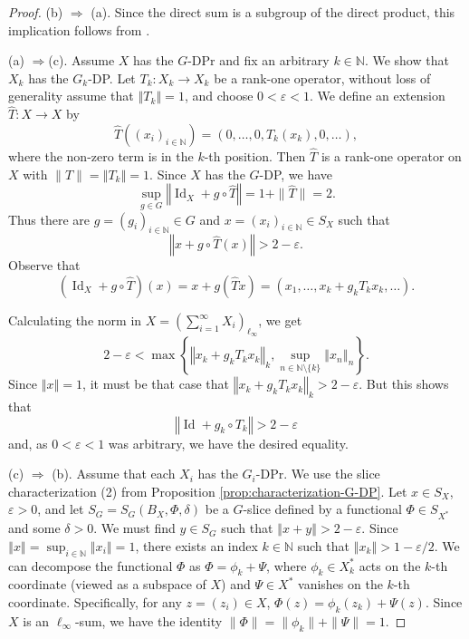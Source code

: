 \documentclass[a4paper,12pt]{amsart}
\theoremstyle{definition}
\theoremstyle{definition}
\theoremstyle{remark}
\numberwithin{equation}{section}
\newcommand{\N}{\mathbb{N}}
\DeclareMathOperator{\id}{Id}
\newcommand{\<}{\langle}
\renewcommand{\>}{\rangle}
\newcommand{\norm}[1]{\left\Vert#1\right\Vert}
\newcommand{\e}{\varepsilon}
\newcommand{\eps}{\e}
\begin{document}
	
	\begin{proof} (b) $\Rightarrow$ (a). Since the direct sum is a subgroup of the direct product, this implication follows from .
		
		\noindent
		(a) $\Rightarrow $(c). Assume $X$ has the $G$-DPr and fix an arbitrary $k \in \N$. We show that $X_k$ has the $G_k$-DP. Let $T_k: X_k \to X_k$ be a rank-one operator, without loss of generality assume that $\norm{T_k} = 1$, and choose $0<\eps<1$. We define an extension $\hat{T}: X \to X$ by
		\[
		\hat{T}((x_i)_{i \in \N}) = (0, \dots, 0, T_k(x_k), 0, \dots),
		\]
		where the non-zero term is in the $k$-th position. Then $\hat{T}$ is a rank-one operator on $X$ with $\|\hat{T}\| = \norm{T_k} = 1$. Since $X$ has the $G$-DP, we have
		\[
		\sup_{g \in G} \norm{\id_X + g \circ \hat{T}} = 1 + \|\hat{T}\| = 2.
		\]
		Thus there are $g = (g_i)_{i \in \N} \in G$ and $x = (x_i)_{i \in \N} \in S_X$ such that
		\begin{equation*}
			\norm{x + g \circ \hat{T}(x)} > 2 - \eps.
		\end{equation*}
		Observe that
		\[
		(\id_X + g \circ \hat{T})(x) = x + g(\hat{T}x) = (x_1, \dots, x_k + g_k T_k x_k, \dots).
		\]
		
		Calculating the norm in $X = (\sum_{i=1}^\infty X_i)_{\ell_\infty}$, we get
		\begin{equation*}
			2 - \eps < \max \left\{ \norm{x_k + g_k T_k x_k}_k, \sup_{n \in \N \setminus\{k\}} \norm{x_n}_n \right\}.
		\end{equation*}
		Since $\norm{x} = 1$, it must be that case that $\norm{x_k + g_k T_k x_k}_k > 2-\eps$. But this shows that
		\begin{equation*}
			\norm{\id + g_k \circ T_k} > 2-\eps
		\end{equation*}
		and, as $0<\eps <1$ was arbitrary, we have the desired equality.
		
		\noindent
		(c) $\Rightarrow$ (b). Assume that each $X_i$ has the $G_i$-DPr. We use the slice characterization (2) from Proposition \ref{prop:characterization-G-DP}. Let $x \in S_X$, $\eps > 0$, and let $S_G = S_G(B_X, \Phi, \delta)$ be a $G$-slice defined by a functional $\Phi \in S_{X^*}$ and some $\delta>0$. We must find $y \in S_G$ such that $\norm{x+y} > 2 - \eps$. Since $\norm{x} = \sup_{i\in\N} \norm{x_i} = 1$, there exists an index $k \in \N$ such that $\norm{x_k} > 1 - \eps/2$. We can decompose the functional $\Phi$ as $\Phi = \phi_k + \Psi$, where $\phi_k \in X_k^*$ acts on the $k$-th coordinate (viewed as a subspace of $X$) and $\Psi \in X^*$ vanishes on the $k$-th coordinate. Specifically, for any $z=(z_i) \in X$, $\Phi(z) = \phi_k(z_k) + \Psi(z)$. Since $X$ is an $\ell_\infty$-sum, we have the identity $\|\Phi\| = \|\phi_k\| + \|\Psi\| = 1$. 
		

\end{proof}
\end{document}
